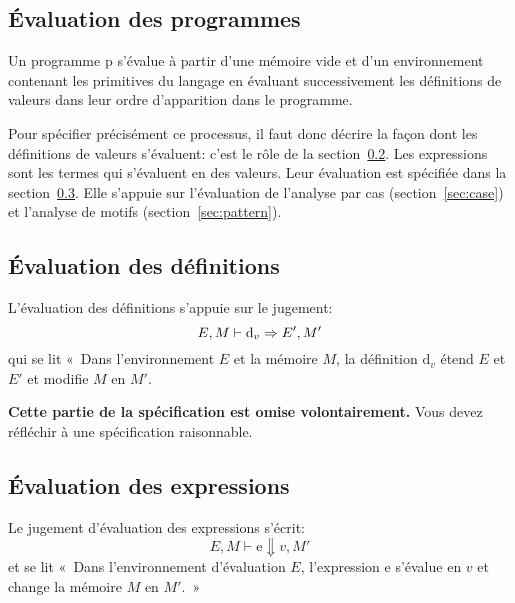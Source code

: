 \documentclass[a4paper,8pt]{article}
\newcommand\mvalue{v}
\newcommand\env{E}
\newcommand\store{M}
\newcommand\meta[1]{\textrm{#1}}
\newcommand\expr{\meta{e}}
\newcommand\vdefinition{\meta{d}_v}
\newcommand\program{\meta{p}}
\newcommand\eval[5]{#1, #2 \vdash #3 \Downarrow #4, #5}
\newcommand\evalvdef[5]{#1, #2 \vdash #3 \Rightarrow #4, #5}
\begin{document}
\subsection{Évaluation des programmes}

Un programme $\program$ s'évalue à partir d'une mémoire vide et d'un
environnement contenant les primitives du langage en évaluant
successivement les définitions de valeurs dans leur ordre d'apparition
dans le programme.

Pour spécifier précisément ce processus, il faut donc décrire la façon
dont les définitions de valeurs s'évaluent: c'est le rôle de la
section~\ref{sec:evaldef}. Les expressions sont les termes qui
s'évaluent en des valeurs. Leur évaluation est spécifiée dans la
section~\ref{sec:exp}.  Elle s'appuie sur l'évaluation de l'analyse
par cas (section~\ref{sec:case}) et l'analyse de motifs
(section~\ref{sec:pattern}).

\subsection{Évaluation des définitions}
\label{sec:evaldef}

L'évaluation des définitions s'appuie sur le jugement:
\[
  \evalvdef\env\store\vdefinition{\env'}{\store'} \\
\]
qui se lit «~Dans l'environnement $\env$ et la mémoire $\store$, la
définition $\vdefinition$ étend $\env$ et $\env'$ et modifie $\store$
en $\store'$.

\textbf{Cette partie de la spécification est omise volontairement.}
Vous devez réfléchir à une spécification raisonnable. 


\subsection{Évaluation des expressions}
\label{sec:exp}

Le jugement d'évaluation des expressions s'écrit:
\[
\eval\env\store\expr\mvalue{\store'}
\]
et se lit
«~Dans l'environnement d'évaluation $\env$,
  l'expression $\expr$ s'évalue en $\mvalue$ et change la mémoire $\store$ en $\store'$.~»
\end{document}
